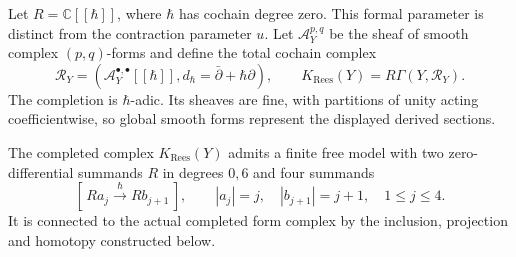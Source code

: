 Let $R=\mathbb C[[\hbar]]$, where $\hbar$ has cochain
degree zero. This formal parameter is distinct from
the contraction parameter $u$. Let
$\mathcal A_Y^{p,q}$ be the sheaf of smooth complex
$(p,q)$-forms and define the total cochain complex
\begin{equation}\label{hr:eq:Rees-definition}
 \mathcal R_Y=
 \left(\mathcal A_Y^{\bullet,\bullet}[[\hbar]],
                  d_\hbar=\bar\partial+\hbar\partial\right),
 \qquad
 K_{\mathrm{Rees}}(Y)=R\Gamma(Y,\mathcal R_Y).
\end{equation}
The completion is $\hbar$-adic. Its sheaves are fine,
with partitions of unity acting coefficientwise, so global
smooth forms represent the displayed derived sections.

\begin{theorem}\label{hr:thm:Rees-model}
The completed complex $K_{\mathrm{Rees}}(Y)$ admits a
finite free model with two zero-differential summands
$R$ in degrees $0,6$ and four summands
\begin{equation}\label{hr:eq:four-pairs}
 [\,Ra_j\xrightarrow{\ \hbar\ }Rb_{j+1}\,],
 \qquad |a_j|=j,\quad |b_{j+1}|=j+1,\quad 1\le j\le4.
\end{equation}
It is connected to the actual completed form complex
by the inclusion, projection and homotopy constructed
below.
\end{theorem}

